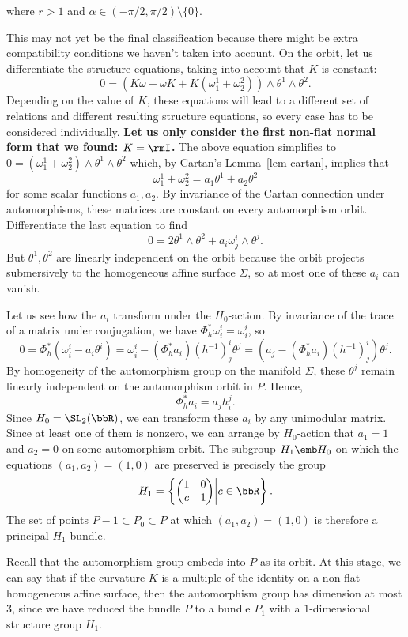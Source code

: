 where $r>1$ and $\alpha\in (-\pi/2,\pi/2)\setminus\{0\}$.

This may not yet be the final classification because there might be extra compatibility conditions we haven't taken into account. On the orbit, let us differentiate the structure equations, taking into account that $K$ is constant:
\[0=(K\omega-\omega K+K(\omega^1_1+\omega^2_2))\wedge\theta^1\wedge\theta^2.\]
Depending on the value of $K$, these equations will lead to a different set of relations and different resulting structure equations, so every case has to be considered individually. \textbf{Let us only consider the first non-flat normal form that we found: $K=\rmI$.} The above equation simplifies to $0=(\omega^1_1+\omega^2_2)\wedge\theta^1\wedge\theta^2$ which, by Cartan's Lemma~\ref{lem cartan}, implies that 
\[\omega^1_1+\omega^2_2=a_1\theta^1+a_2\theta^2\]
for some scalar functions $a_1,a_2$. By invariance of the Cartan connection under automorphisms, these matrices are constant on every automorphism orbit. Differentiate the last equation to find 
\[0=2\theta^1\wedge\theta^2+a_i\omega^i_j\wedge\theta^j.\]
But $\theta^1,\theta^2$ are linearly independent on the orbit because the orbit projects submersively to the homogeneous affine surface $\varSigma$, so at most one of these $a_i$ can vanish.

Let us see how the $a_i$ transform under the $H_0$-action. By invariance of the trace of a matrix under conjugation, we have $\Phi_h^\ast \omega^i_i=\omega^i_i$, so 
\[
    0=\Phi^\ast_h(\omega^i_i-a_i\theta^i)=\omega^i_i-(\Phi^\ast_h a_i)(h^{-1})^i_j\theta^j=(a_j-(\Phi^\ast_ha_i)(h^{-1})^i_j)\theta^j.
\]
By homogeneity of the automorphism group on the manifold $\varSigma$, these $\theta^j$ remain linearly independent on the automorphism orbit in $P$. Hence, 
\[\Phi_h^\ast a_i=a_jh^j_i.\]
Since $H_0=\SL_2(\bbR)$, we can transform these $a_i$ by any unimodular matrix. Since at least one of them is nonzero, we can arrange by $H_0$-action that $a_1=1$ and $a_2=0$ on some automorphism orbit. The subgroup $H_1\emb H_0$ on which the equations $(a_1,a_2)=(1,0)$ are preserved is precisely the group 
\[H_1=\left\{\begin{pmatrix}
1 & 0\\ c& 1
\end{pmatrix}\middle| c\in\bbR\right\}.\label{eq 10015}\]
The set of points $P-1\subset  P_0\subset P$ at which $(a_1,a_2)=(1,0)$ is therefore a principal $H_1$-bundle. 

Recall that the automorphism group embeds into $P$ as its orbit. At this stage, we can say that if the curvature $K$ is a multiple of the identity on a non-flat homogeneous affine surface, then the automorphism group has dimension at most $3$, since we have reduced the bundle $P$ to a bundle $P_1$ with a $1$-dimensional structure group $H_1$. 

